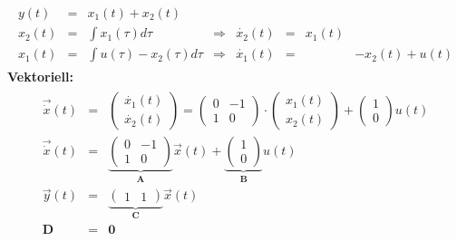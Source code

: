 \documentclass[12pt,a4paper,ngerman]{scrartcl}
\begin{document}
\begin{align*}
  \begin{array}{llllllll}
    y(t)&=&x_1(t)+x_2(t)\\
    x_2(t)&=&\int{x_1(\tau)d\tau}&\Rightarrow&\dot{x_2}(t)&=&x_1(t)\\
    x_1(t)&=&\int{u(\tau)-x_2(\tau)d\tau}&\Rightarrow&\dot{x_1}(t)&=&&-x_2(t)+u(t)
  \end{array}
\end{align*}
\textbf{Vektoriell:}
\begin{align*}
  \begin{array}{lllll}
    \vec{\dot{x}}(t)&=&
    \begin{pmatrix}
      \dot{x_1}(t)\\
      \dot{x_2}(t)
    \end{pmatrix}
=
\begin{pmatrix}
  0&-1\\
  1&0
\end{pmatrix}
\cdot
\begin{pmatrix}
  x_1(t)\\
  x_2(t)
\end{pmatrix}
+
\begin{pmatrix}
  1\\0
\end{pmatrix}
u(t)\\[1cm]
\vec{\dot{x}}(t)&=&
\underbrace{
\begin{pmatrix}
  0&-1\\
  1&0
\end{pmatrix}}_{\mathbf{A}}
\vec{x}(t)+
\underbrace{
\begin{pmatrix}
1\\0  
\end{pmatrix}}_{\mathbf{B}}u(t)\\[1cm]
\vec{y}(t)&=& \underbrace{
  \begin{pmatrix}
    1&1
  \end{pmatrix}}_{\mathbf{C}}\vec{x}(t)\\
\mathbf{D}&=& \mathbf{0}
  \end{array}
\end{align*}
\end{document}
